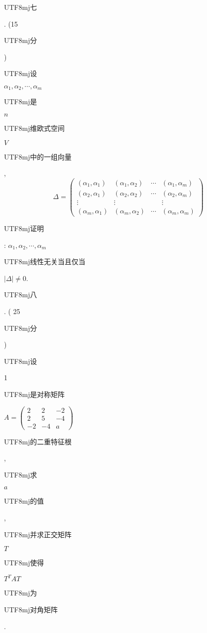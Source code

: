 \documentclass[10pt]{article}
\begin{document}
\begin{CJK}{UTF8}{mj}七\end{CJK}. (15 \begin{CJK}{UTF8}{mj}分\end{CJK}) \begin{CJK}{UTF8}{mj}设\end{CJK} $\alpha_{1}, \alpha_{2}, \cdots, \alpha_{m}$ \begin{CJK}{UTF8}{mj}是\end{CJK} $n$ \begin{CJK}{UTF8}{mj}维欧式空间\end{CJK} $V$ \begin{CJK}{UTF8}{mj}中的一组向量\end{CJK},
$$
\Delta=\left(\begin{array}{cccc}
\left(\alpha_{1}, \alpha_{1}\right) & \left(\alpha_{1}, \alpha_{2}\right) & \cdots & \left(\alpha_{1}, \alpha_{m}\right) \\
\left(\alpha_{2}, \alpha_{1}\right) & \left(\alpha_{2}, \alpha_{2}\right) & \cdots & \left(\alpha_{2}, \alpha_{m}\right) \\
\vdots & \vdots & & \vdots \\
\left(\alpha_{m}, \alpha_{1}\right) & \left(\alpha_{m}, \alpha_{2}\right) & \cdots & \left(\alpha_{m}, \alpha_{m}\right)
\end{array}\right)
$$
\begin{CJK}{UTF8}{mj}证明\end{CJK}: $\alpha_{1}, \alpha_{2}, \cdots, \alpha_{m}$ \begin{CJK}{UTF8}{mj}线性无关当且仅当\end{CJK} $|\Delta| \neq 0$. \begin{CJK}{UTF8}{mj}八\end{CJK}. ( 25 \begin{CJK}{UTF8}{mj}分\end{CJK}) \begin{CJK}{UTF8}{mj}设\end{CJK} 1 \begin{CJK}{UTF8}{mj}是对称矩阵\end{CJK} $A=\left(\begin{array}{ccc}2 & 2 & -2 \\ 2 & 5 & -4 \\ -2 & -4 & a\end{array}\right)$ \begin{CJK}{UTF8}{mj}的二重特征根\end{CJK}, \begin{CJK}{UTF8}{mj}求\end{CJK} $a$ \begin{CJK}{UTF8}{mj}的值\end{CJK}, \begin{CJK}{UTF8}{mj}并求正交矩阵\end{CJK} $T$ \begin{CJK}{UTF8}{mj}使得\end{CJK} $T^{T} A T$ \begin{CJK}{UTF8}{mj}为\end{CJK} \begin{CJK}{UTF8}{mj}对角矩阵\end{CJK}.
\end{document}
